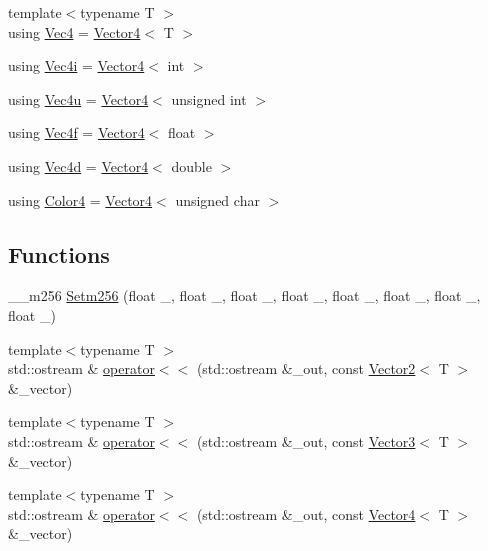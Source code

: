 \begin{DoxyCompactItemize}
\item 
{\footnotesize template$<$typename T $>$ }\\using \mbox{\hyperlink{namespacepad_1_1math_a97a1193114b33cea7a82ae656d507825}{Vec4}} = \mbox{\hyperlink{structpad_1_1math_1_1_vector4}{Vector4}}$<$ T $>$
\item 
using \mbox{\hyperlink{namespacepad_1_1math_a6b61fad19375a5164da9e1a86403f208}{Vec4i}} = \mbox{\hyperlink{structpad_1_1math_1_1_vector4}{Vector4}}$<$ int $>$
\item 
using \mbox{\hyperlink{namespacepad_1_1math_ad5b8d7d51edf8173f6a0ddbbb792c803}{Vec4u}} = \mbox{\hyperlink{structpad_1_1math_1_1_vector4}{Vector4}}$<$ unsigned int $>$
\item 
using \mbox{\hyperlink{namespacepad_1_1math_a4eb77014ac7b74bd24cf73bca82ac3a3}{Vec4f}} = \mbox{\hyperlink{structpad_1_1math_1_1_vector4}{Vector4}}$<$ float $>$
\item 
using \mbox{\hyperlink{namespacepad_1_1math_a845efb6de5d2237d1a7f27cf87741454}{Vec4d}} = \mbox{\hyperlink{structpad_1_1math_1_1_vector4}{Vector4}}$<$ double $>$
\item 
using \mbox{\hyperlink{namespacepad_1_1math_af6a050aafcf279514a0beada2fb7a173}{Color4}} = \mbox{\hyperlink{structpad_1_1math_1_1_vector4}{Vector4}}$<$ unsigned char $>$
\end{DoxyCompactItemize}
\subsection*{Functions}
\begin{DoxyCompactItemize}
\item 
\+\_\+\+\_\+m256 \mbox{\hyperlink{namespacepad_1_1math_aac19498ef8202350ee106335fcb9351d}{Setm256}} (float \+\_, float \+\_, float \+\_, float \+\_, float \+\_, float \+\_, float \+\_, float \+\_)
\item 
{\footnotesize template$<$typename T $>$ }\\std\+::ostream \& \mbox{\hyperlink{namespacepad_1_1math_aef2c4cef650688967cb74c75c5d4aafa}{operator$<$$<$}} (std\+::ostream \&\+\_\+out, const \mbox{\hyperlink{structpad_1_1math_1_1_vector2}{Vector2}}$<$ T $>$ \&\+\_\+vector)
\item 
{\footnotesize template$<$typename T $>$ }\\std\+::ostream \& \mbox{\hyperlink{namespacepad_1_1math_a9e468612d54c187ec0eaac48e304e673}{operator$<$$<$}} (std\+::ostream \&\+\_\+out, const \mbox{\hyperlink{structpad_1_1math_1_1_vector3}{Vector3}}$<$ T $>$ \&\+\_\+vector)
\item 
{\footnotesize template$<$typename T $>$ }\\std\+::ostream \& \mbox{\hyperlink{namespacepad_1_1math_aea739f95f7147095cec34ccedee7eea2}{operator$<$$<$}} (std\+::ostream \&\+\_\+out, const \mbox{\hyperlink{structpad_1_1math_1_1_vector4}{Vector4}}$<$ T $>$ \&\+\_\+vector)
\end{DoxyCompactItemize}


